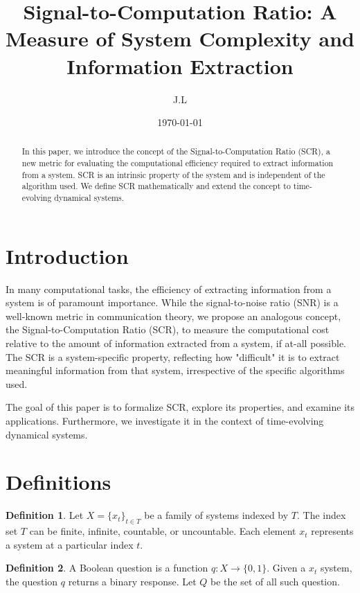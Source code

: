 \documentclass[11pt,a4paper]{article}
\title{Signal-to-Computation Ratio: A Measure of System Complexity and Information Extraction}
\author{J.L}
\date{\today}
\theoremstyle{definition}
\newtheorem{defn}{Definition}[section]
\theoremstyle{remark}
\numberwithin{equation}{section}
\begin{document}
\maketitle

\begin{abstract}
In this paper, we introduce the concept of the Signal-to-Computation Ratio (SCR), a new metric for evaluating the computational efficiency required to extract information from a system. SCR is an intrinsic property of the system and is independent of the algorithm used. We define SCR mathematically and extend the concept to time-evolving dynamical systems.
\end{abstract}

\section{Introduction}
In many computational tasks, the efficiency of extracting information from a system is of paramount importance. 
While the signal-to-noise ratio (SNR) is a well-known metric in communication theory, we propose an analogous concept, the Signal-to-Computation Ratio (SCR), to measure the computational cost relative to the amount of information extracted from a system, if at-all possible. 
The SCR is a system-specific property, reflecting how "difficult" it is to extract meaningful information from that system, irrespective of the specific algorithms used.

The goal of this paper is to formalize SCR, explore its properties, and examine its applications.
Furthermore, we investigate it  in the context of time-evolving dynamical systems. 



\section{Definitions}

\begin{defn}
Let \( X = \{x_t\}_{t \in T} \) be a family of systems indexed by \( T \).
The index set \( T \) can be finite, infinite, countable, or uncountable.
Each element \( x_t \) represents a system at a particular index \( t \).
\end{defn}

\begin{defn}
A Boolean question is a function \( q: X \rightarrow \{0, 1\} \).
Given a  \( x_t \) system, the question \( q \) returns a binary response.
Let $Q$ be the set of all such question. 
\end{defn}
\end{document}
